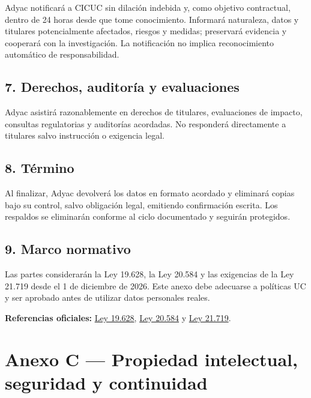 \documentclass[
]{article}
\begin{document}
Adyac notificará a CICUC sin dilación indebida y, como objetivo
contractual, dentro de 24 horas desde que tome conocimiento. Informará
naturaleza, datos y titulares potencialmente afectados, riesgos y
medidas; preservará evidencia y cooperará con la investigación. La
notificación no implica reconocimiento automático de responsabilidad.

\hypertarget{7-derechos-auditoruxeda-y-evaluaciones}{%
\subsection{7. Derechos, auditoría y
evaluaciones}\label{7-derechos-auditoruxeda-y-evaluaciones}}

Adyac asistirá razonablemente en derechos de titulares, evaluaciones de
impacto, consultas regulatorias y auditorías acordadas. No responderá
directamente a titulares salvo instrucción o exigencia legal.

\hypertarget{8-tuxe9rmino}{%
\subsection{8. Término}\label{8-tuxe9rmino}}

Al finalizar, Adyac devolverá los datos en formato acordado y eliminará
copias bajo su control, salvo obligación legal, emitiendo confirmación
escrita. Los respaldos se eliminarán conforme al ciclo documentado y
seguirán protegidos.

\hypertarget{9-marco-normativo}{%
\subsection{9. Marco normativo}\label{9-marco-normativo}}

Las partes considerarán la Ley 19.628, la Ley 20.584 y las exigencias de
la Ley 21.719 desde el 1 de diciembre de 2026. Este anexo debe adecuarse
a políticas UC y ser aprobado antes de utilizar datos personales reales.

\textbf{Referencias oficiales:}
\href{https://www.bcn.cl/leychile/Navegar?idNorma=141599}{Ley 19.628},
\href{https://www.bcn.cl/leychile/Navegar?idNorma=1039348}{Ley 20.584} y
\href{https://www.bcn.cl/leychile/navegar?idNorma=1209272}{Ley 21.719}.

\hypertarget{anexo-c--propiedad-intelectual-seguridad-y-continuidad}{%
\section{Anexo C --- Propiedad intelectual, seguridad y
continuidad}\label{anexo-c--propiedad-intelectual-seguridad-y-continuidad}}
\end{document}
